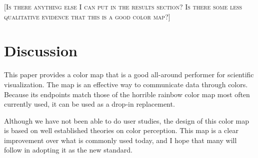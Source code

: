 \documentclass{vgtc}                          %
\newcommand{\sticky}[1]{\textsc{[#1]}}
\begin{document}
\sticky{Is there anything else I can put in the results section?  Is there
  some less qualitative evidence that this is a good color map?}


\section{Discussion}
\label{sec:Discussion}

This paper provides a color map that is a good all-around performer for
scientific visualization.  The map is an effective way to communicate data
through colors.  Because its endpoints match those of the horrible rainbow
color map most often currently used, it can be used as a drop-in
replacement.

Although we have not been able to do user studies, the design of this color
map is based on well established theories on color perception.  This map is
a clear improvement over what is commonly used today, and I hope that many
will follow in adopting it as the new standard.





\end{document}

